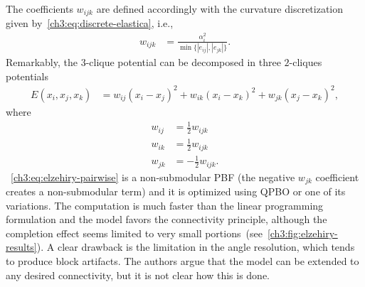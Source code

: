 The coefficients $w_{ijk}$ are defined accordingly with the curvature discretization given by~\cref{ch3:eq:discrete-elastica}, i.e.,
\begin{align*}
	w_{ijk} &= \frac{ \alpha_i ^2}{\min \{ |e_{ij}|,|e_{jk}| \} }.
\end{align*}
%
Remarkably, the $3$-clique potential can be decomposed in three $2$-cliques potentials 
\begin{align}
	E(x_i,x_j,x_k) &= w_{ij}(x_i-x_j)^2 + w_{ik}(x_i-x_k)^2 + w_{jk}(x_j-x_k)^2,
	\label{ch3:eq:elzehiry-pairwise}
\end{align}
%
where
\begin{align*}
	w_{ij} &= \frac{1}{2}w_{ijk} \\
	w_{ik} &= \frac{1}{2}w_{ijk} \\	
	w_{jk} &= -\frac{1}{2}w_{ijk}.
\end{align*}
%
~\cref{ch3:eq:elzehiry-pairwise} is a non-submodular PBF (the negative $w_{jk}$ coefficient creates a non-submodular term) and it is optimized using QPBO or one of its variations. The computation is much faster than the linear programming formulation and the model favors the connectivity principle, although the completion effect seems limited to very small portions~(see~\cref{ch3:fig:elzehiry-results}). A clear drawback is the limitation in the angle resolution, which tends to produce block artifacts. The authors argue that the model can be extended to any desired connectivity, but it is not clear how this is done.

